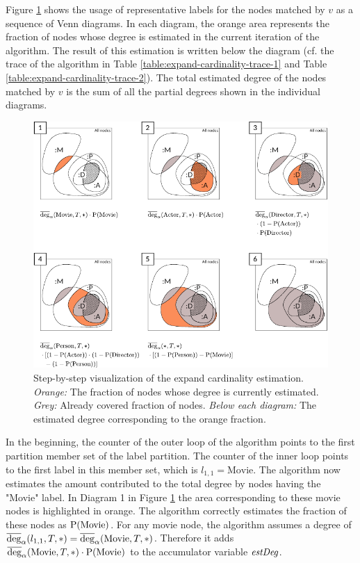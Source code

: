 Figure \ref{fig:expand-cardinality-steps} shows the usage of representative
labels for the nodes matched by $v$ as a sequence of Venn diagrams.
In each diagram, the orange area represents the fraction of nodes whose degree
is estimated in the current iteration of the algorithm.
The result of this estimation is written below the diagram (cf. the trace
of the algorithm in Table \ref{table:expand-cardinality-trace-1} and
Table \ref{table:expand-cardinality-trace-2}).
The total estimated degree of the nodes matched by $v$ is the sum of all the
partial degrees shown in the individual diagrams.

\begin{figure}
  \centering
  \includegraphics[width=\textwidth]{figures/labels-for-estimation-step-by-step-complete-formulas.pdf}
  \caption{Step-by-step visualization of the expand cardinality estimation.
           \textit{Orange:} The fraction of nodes whose degree is currently estimated.
           \textit{Grey:} Already covered fraction of nodes.
           \textit{Below each diagram:} The estimated degree corresponding to the orange fraction.}
  \label{fig:expand-cardinality-steps}
\end{figure}

\begin{landscape}
  
  
\end{landscape}

In the beginning, the counter of the outer loop of the algorithm points to
the first partition member set of the label partition.
The counter of the inner loop points to the first label in this member set,
which is $l_{1,1} = \text{Movie}$.
The algorithm now estimates the amount contributed to the total degree
by nodes having the "Movie" label.
In Diagram 1 in Figure \ref{fig:expand-cardinality-steps} the area
corresponding to these movie nodes is highlighted in orange.
The algorithm correctly estimates the fraction of these nodes as
$\operatorname{P}(\text{Movie})$.
For any movie node, the algorithm assumes a degree of
$\avgdeg_\alpha(l_{1,1}, T, *) = \avgdeg_\alpha(\text{Movie}, T, *)$.
Therefore it adds
$\avgdeg_\alpha(\text{Movie}, T, *) \cdot \sprob(\text{Movie})$ to the
accumulator variable $\textit{estDeg}$.

